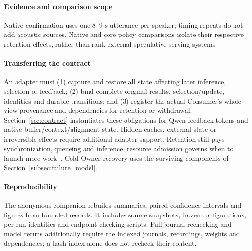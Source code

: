 \paragraph{Evidence and comparison scope}
Native confirmation uses one 8--9-s utterance per speaker; timing repeats
do not add acoustic sources. Native and core policy comparisons isolate
their respective retention effects, rather than rank external
speculative-serving systems.

\paragraph{Transferring the contract}
An adapter must (1) capture and restore all state affecting later
inference, selection or feedback; (2) bind complete original results,
selection/update, identities and durable transitions; and (3) register
the actual Consumer's whole-view provenance and dependencies for retention
or withdrawal. Section~\ref{sec:contract} instantiates these obligations
for Qwen feedback tokens and native buffer/context/alignment state.
Hidden caches, external state or irreversible effects require additional
adapter support.
Retention still pays synchronization, queueing and inference; resource
admission governs when to launch more work~\cite{welsh2001seda}.
Cold Owner recovery uses the surviving components of
Section~\ref{subsec:failure_model}.

\paragraph{Reproducibility}
The anonymous companion rebuilds summaries, paired confidence intervals and figures
from bounded records. It includes source snapshots, frozen configurations,
per-run identities and endpoint-checking scripts. Full-journal rechecking
and model reruns additionally require the indexed journals, recordings,
weights and dependencies; a hash index alone does not recheck their content.
